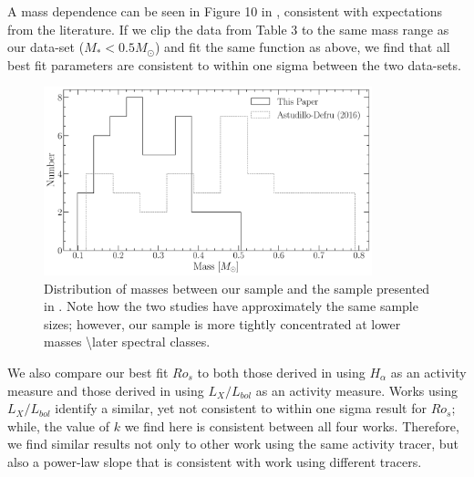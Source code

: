 A mass dependence can be seen in Figure 10 in \citet{Def17}, consistent
with expectations from the literature. If we clip the data from \citet{Def17}
Table 3 to the same mass range as our data-set ($M_{*} < 0.5M_{\odot}$) and fit
the same function as above, we find that all best fit parameters are consistent
to within one sigma between the two data-sets. 

\begin{figure}
    \centering
    \includegraphics[width=0.85\textwidth]{figures/magActivity/B2020vsAD2016_Masses.pdf}
	\caption{Distribution of masses between our sample and the sample presented
	in \citet{Def17}. Note how the two studies have approximately the same
	sample sizes; however, our sample is more tightly concentrated at lower
	masses \textbackslash later spectral classes.}
    \label{fig:massDistribution}
\end{figure}

We also compare our best fit $Ro_{s}$ to both those derived in
\citet{Newton2017} using $H_{\alpha}$ as an activity measure and those derived
in \citep{ Wri18, Magaudda2020} using $L_{X}/L_{bol}$ as an activity measure.
Works using $L_{X}/L_{bol}$ identify a similar, yet not consistent to within
one sigma result for $Ro_{s}$; while, the value of $k$ we find here is
consistent between all four works. Therefore, we find similar results not only
to other work using the same activity tracer, but also a power-law slope that
is consistent with work using different tracers. 
